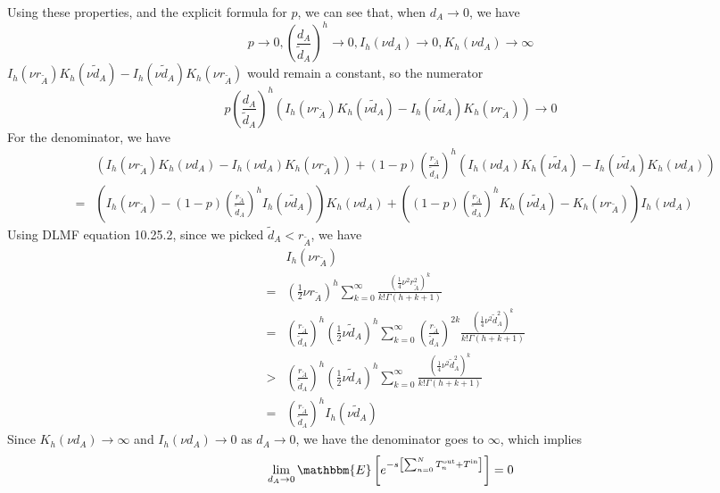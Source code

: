 \documentclass[english, aip, jcp, priprint, graphicx,floatfix]{revtex4-1}
\newcommand{\tmop}[1]{\ensuremath{\operatorname{#1}}}
\theoremstyle{plain}
\theoremstyle{definition}
\theoremstyle{plain}
\begin{document}
Using these properties, and the explicit formula for $p$, we can see that,
when $d_A \rightarrow 0$, we have
\[ p \rightarrow 0, \left( \frac{d_A}{\tilde{d}_A} \right)^h \rightarrow 0,
I_h (\nu d_A) \rightarrow 0, K_h (\nu d_A) \rightarrow \infty \]
$I_h (\nu r_{\tilde{A}}) K_h (\nu \tilde{d}_A) - I_h (\nu \tilde{d}_A) K_h
(\nu r_{\tilde{A}})$ would remain a constant, so the numerator
\[ p \left( \frac{d_A}{\tilde{d}_A} \right)^h (I_h (\nu r_{\tilde{A}}) K_h
(\nu \tilde{d}_A) - I_h (\nu \tilde{d}_A) K_h (\nu r_{\tilde{A}}))
\rightarrow 0 \]
For the denominator, we have
\begin{eqnarray*}
&  & (I_h (\nu r_{\tilde{A}}) K_h (\nu d_A) - I_h (\nu d_A) K_h (\nu
r_{\tilde{A}})) + (1 - p) \left( \frac{r_{\tilde{A}}}{\tilde{d}_A} \right)^h
(I_h (\nu d_A) K_h (\nu \tilde{d}_A) - I_h (\nu \tilde{d}_A) K_h (\nu
d_A))\\
& = & \left( I_h (\nu r_{\tilde{A}}) - (1 - p) \left(
\frac{r_{\tilde{A}}}{\tilde{d}_A} \right)^h I_h (\nu \tilde{d}_A) \right)
K_h (\nu d_A) + \left( (1 - p) \left( \frac{r_{\tilde{A}}}{\tilde{d}_A}
\right)^h K_h (\nu \tilde{d}_A) - K_h (\nu r_{\tilde{A}}) \right) I_h (\nu
d_A)
\end{eqnarray*}
Using DLMF\cite{noauthor_undated-ti} equation 10.25.2, since we picked $\tilde{d}_A < r_{\tilde{A}}$, we
have
\begin{eqnarray*}
&  & I_h (\nu r_{\tilde{A}})\\
& = & \left( \frac{1}{2} \nu r_{\tilde{A}} \right)^h \sum_{k = 0}^{\infty}
\frac{\left( \frac{1}{4} \nu^2 r_{\tilde{A}}^2 \right)^k}{k! \Gamma (h + k +
1)}\\
& = & \left( \frac{r_{\tilde{A}}}{\tilde{d}_A} \right)^h \left( \frac{1}{2}
\nu \tilde{d}_A \right)^h \sum_{k = 0}^{\infty} \left(
\frac{r_{\tilde{A}}}{\tilde{d}_A} \right)^{2 k} \frac{\left( \frac{1}{4}
\nu^2 \tilde{d}_A^2 \right)^k}{k! \Gamma (h + k + 1)}\\
& > & \left( \frac{r_{\tilde{A}}}{\tilde{d}_A} \right)^h \left( \frac{1}{2}
\nu \tilde{d}_A \right)^h \sum_{k = 0}^{\infty} \frac{\left( \frac{1}{4}
\nu^2 \tilde{d}_A^2 \right)^k}{k! \Gamma (h + k + 1)}\\
& = & \left( \frac{r_{\tilde{A}}}{\tilde{d}_A} \right)^h I_h (\nu
\tilde{d}_A)
\end{eqnarray*}
Since $K_h (\nu d_A) \rightarrow \infty$ and $I_h (\nu d_A) \rightarrow 0$ as
$d_A \rightarrow 0$, we have the denominator goes to $\infty$, which implies
\[ \lim_{d_A \rightarrow 0} \mathbbm{E} \left[ e^{- s \left[ \sum_{n = 0}^N
T_n^{\tmop{out}} + T^{\tmop{in}} \right]} \right] = 0 \]
\end{document}

